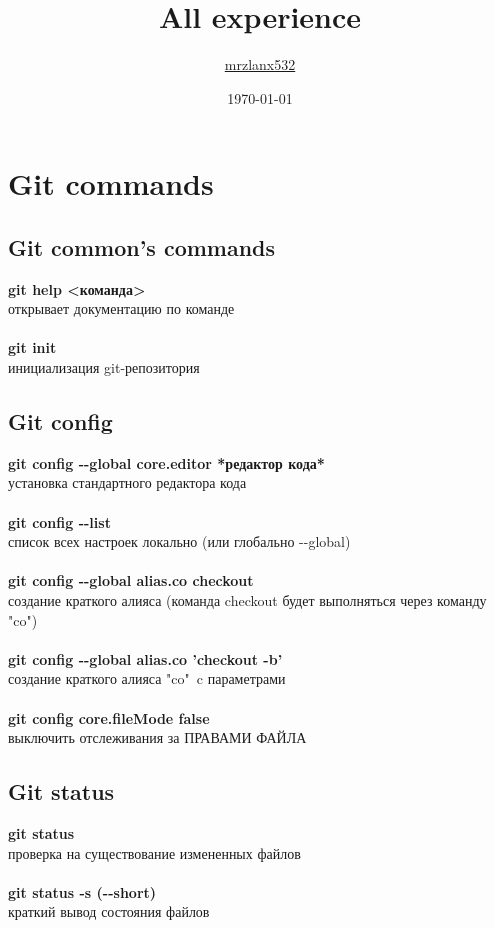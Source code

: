 \documentclass[a4paper, 12px]{article}
\author{ \href{https://github.com/mrzlanx532}{mrzlanx532}}
\title{All experience}
\date{\today}
\begin{document}
	
\maketitle

\tableofcontents{}
\clearpage 

\section{Git commands}

\subsection{Git common's commands}


\textbf{git help <команда>}\\открывает документацию по команде\\\\
\textbf{git init}\\инициализация git-репозитория


\subsection{Git config}

\textbf{git config -\--global core.editor *редактор кода*}\\ установка стандартного редактора кода\\\\
\textbf{git config -\--list}\\список всех настроек локально (или глобально -\--global)\\\\
\textbf{git config -\--global alias.co checkout}\\создание краткого алияса (команда checkout будет выполняться через команду "co")\\\\
\textbf{git config -\--global alias.co 'checkout -b'}\\создание краткого алияса "co"\ c параметрами\\\\
\textbf{git config core.fileMode false}\\выключить отслеживания за ПРАВАМИ ФАЙЛА

\subsection{Git status}

\textbf{git status}\\проверка на существование измененных файлов\\\\
\textbf{git status -s (-\--short)}\\краткий вывод состояния файлов
\end{document}
